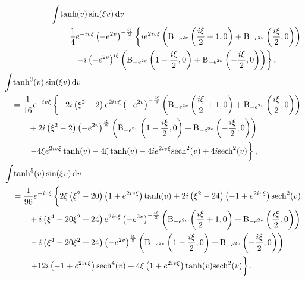 \begin{align}
\begin{split}
	&\int \! \tanh(v) \sin(\xi v) \, \mathrm{d}v \\
	&\quad = \frac{1}{4} e^{-i v \xi} \left(-e^{2 v}\right)^{-\frac{i \xi}{2}} \left\{ 
	    i e^{2 i v \xi} \left(\mathrm{B}_{-e^{2 v}}\left(\frac{i \xi}{2}+1,0\right)+\mathrm{B}_{-e^{2 v}}\left(\frac{i \xi}{2},0\right)\right) \right. \\
	&\quad\quad\quad \left. -i \left(-e^{2 v}\right)^{i \xi} \left(\mathrm{B}_{-e^{2 v}}\left(1-\frac{i \xi}{2},0\right)+\mathrm{B}_{-e^{2 v}}\left(-\frac{i \xi}{2},0\right)\right)\right\},
\end{split} \\
\begin{split}
	&\int \! \tanh^3(v) \sin(\xi v) \, \mathrm{d}v \\
	&\quad = \frac{1}{16} e^{-i v \xi} \left\{
	    -2 i \left(\xi^2-2\right) e^{2 i v \xi} \left(-e^{2 v}\right)^{-\frac{i \xi}{2}} \left(\mathrm{B}_{-e^{2 v}}\left(\frac{i \xi}{2}+1,0\right)+\mathrm{B}_{-e^{2 v}}\left(\frac{i \xi}{2},0\right)\right) \right. \\
	    &\quad\quad\quad + 2 i \left(\xi^2-2\right) \left(-e^{2 v}\right)^{\frac{i \xi}{2}} \left(\mathrm{B}_{-e^{2 v}}\left(1-\frac{i \xi}{2},0\right)+\mathrm{B}_{-e^{2 v}}\left(-\frac{i \xi}{2},0\right)\right) \\
	    &\quad\quad\quad  \left. -4 \xi e^{2 i v \xi} \tanh (v)-4 \xi \tanh (v)-4 i e^{2 i v \xi} \text{sech}^2(v)+4 i \text{sech}^2(v) \vphantom{\frac{B}{B}} \right\},
\end{split} \\
\begin{split}
	&\int \! \tanh^5(v) \sin(\xi v) \, \mathrm{d}v \\
	&\quad = \frac{1}{96} e^{-i v \xi} \left\{ \vphantom{\frac{B}{B}} 2 \xi \left(\xi^2-20\right) \left(1+e^{2 i v \xi}\right) \tanh (v)+2 i \left(\xi^2-24\right) \left(-1+e^{2 i v \xi}\right) \text{sech}^2(v)\right. \\
	&\quad\quad\quad + i \left(\xi^4-20 \xi^2+24\right) e^{2 i v \xi} \left(-e^{2 v}\right)^{-\frac{i \xi}{2}} \left(\mathrm{B}_{-e^{2 v}}\left(\frac{i \xi}{2}+1,0\right)+\mathrm{B}_{-e^{2 v}}\left(\frac{i \xi}{2},0\right)\right) \\
	&\quad\quad\quad -i \left(\xi^4-20 \xi^2+24\right) \left(-e^{2 v}\right)^{\frac{i \xi}{2}} \left(\mathrm{B}_{-e^{2 v}}\left(1-\frac{i \xi}{2},0\right)+\mathrm{B}_{-e^{2 v}}\left(-\frac{i \xi}{2},0\right)\right) \\
	&\quad\quad\quad \left. +12 i \left(-1+e^{2 i v \xi}\right) \text{sech}^4(v)+4 \xi \left(1+e^{2 i v \xi}\right) \tanh (v) \text{sech}^2(v) \vphantom{\frac{B}{B}} \right\}.
\end{split}
\end{align}
